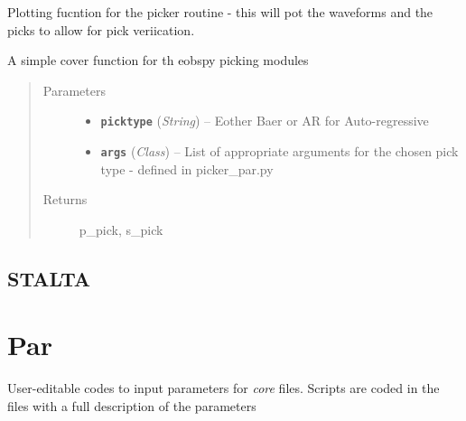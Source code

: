 \documentclass[letterpaper,10pt,english]{sphinxmanual}
\begin{document}
\begin{fulllineitems}
\label{modules:py_picker.picker_plot}
Plotting fucntion for the picker routine - this will pot the waveforms and
the picks to allow for pick veriication.
\begin{quote}\begin{description}
\end{description}\end{quote}

\end{fulllineitems}


\begin{fulllineitems}
\label{modules:py_picker.seism_picker}
A simple cover function for th eobspy picking modules
\begin{quote}\begin{description}
\item[{Parameters}] \leavevmode\begin{itemize}
\item {} 
\textbf{\texttt{picktype}} (\emph{String}) -- Eother Baer or AR for Auto-regressive

\item {} 
\textbf{\texttt{args}} (\emph{Class}) -- List of appropriate arguments for the chosen pick type -
defined in picker\_par.py

\end{itemize}

\item[{Returns}] \leavevmode
p\_pick, s\_pick

\end{description}\end{quote}

\end{fulllineitems}



\section{STALTA}
\label{modules:stalta}\label{modules:module-STALTA}

\chapter{Par}
\label{modules:par}
User-editable codes to input parameters for \emph{core} files.
Scripts are coded in the files with a full description of the parameters
\end{document}
